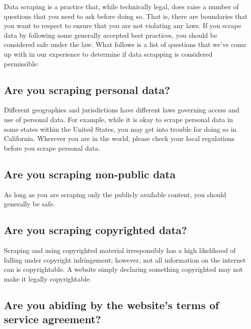 \documentclass[
]{krantz}
\begin{document}
Data scraping is a practice that, while technically legal, does raise a number of questions that you need to ask before doing so. That is, there are boundaries that you want to respect to ensure that you are not violating any laws. If you scrape data by following some generally accepted best practices, you should be considered safe under the law. What follows is a list of questions that we've come up with in our experience to determine if data scrapping is considered permissible:

\hypertarget{are-you-scraping-personal-data}{%
\subsection*{Are you scraping personal data?}\label{are-you-scraping-personal-data}}


Different geographies and jurisdictions have different laws governing access and use of personal data. For example, while it is okay to scrape personal data in some states within the United States, you may get into trouble for doing so in California. Wherever you are in the world, please check your local regulations before you scrape personal data.

\hypertarget{are-you-scraping-non-public-data}{%
\subsection*{Are you scraping non-public data}\label{are-you-scraping-non-public-data}}


As long as you are scraping only the publicly available content, you should generally be safe.

\hypertarget{are-you-scraping-copyrighted-data}{%
\subsection*{Are you scraping copyrighted data?}\label{are-you-scraping-copyrighted-data}}


Scraping and using copyrighted material irresponsibly has a high likelihood of falling under copyright infringement; however, not all information on the internet can is copyrightable. A website simply declaring something copyrighted may not make it legally copyrightable.

\hypertarget{are-you-abiding-by-the-websites-terms-of-service-agreement}{%
\subsection*{Are you abiding by the website's terms of service agreement?}\label{are-you-abiding-by-the-websites-terms-of-service-agreement}}
\end{document}
